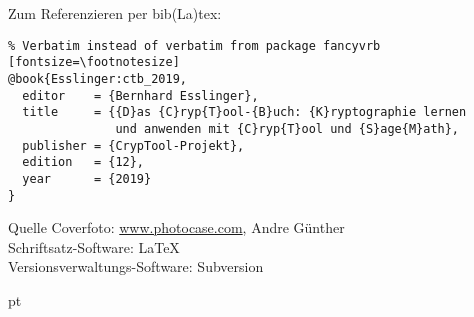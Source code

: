 \vfill

Zum Referenzieren per bib(La)tex:
\begin{Verbatim}% Verbatim instead of verbatim from package fancyvrb
[fontsize=\footnotesize]
@book{Esslinger:ctb_2019,
  editor    = {Bernhard Esslinger},
  title     = {{D}as {C}ryp{T}ool-{B}uch: {K}ryptographie lernen
               und anwenden mit {C}ryp{T}ool und {S}age{M}ath},
  publisher = {CrypTool-Projekt},
  edition   = {12},
  year      = {2019}
}
\end{Verbatim}



\vfill

Quelle Coverfoto: \url{www.photocase.com}, Andre Günther\\
Schriftsatz-Software: \LaTeX\\
Versionsverwaltungs-Software: Subversion

\newpage


\newpage
{}
\clearpage{}
{}
\tableofcontents

\newpage \normalsize

 \setcounter{mycounterDefaultParskip}{4}
\parskip \value{mycounterDefaultParskip} pt

\renewcommand{\bibname}{Literaturverzeichnis \CTBChapName{}}  %
\newcommand{\CTBChapName}{(Intro)}


